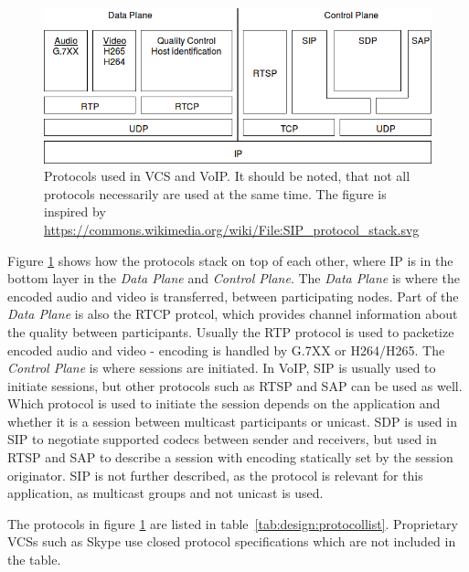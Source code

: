 \begin{figure}[H]
	\centering
	\includegraphics[width=\textwidth]{figures/protocol_stack}
	\caption{Protocols used in VCS and VoIP. It should be noted, that not all protocols necessarily are used at the same time. The figure is inspired by \url{https://commons.wikimedia.org/wiki/File:SIP_protocol_stack.svg}}
	\label{fig:design:protocolstack}
\end{figure} 

Figure \ref{fig:design:protocolstack} shows how the protocols stack on top of each other, where IP is in the bottom layer in the \textit{Data Plane} and \textit{Control Plane}. The  \textit{Data Plane} is where the encoded audio and video is transferred, between participating nodes. Part of the \textit{Data Plane} is also the RTCP protcol, which provides channel information about the quality between participants. Usually the RTP protocol is used to packetize encoded audio and video - encoding is handled by G.7XX or H264/H265. The \textit{Control Plane} is where sessions are initiated. In VoIP, \ac{SIP} is usually used to initiate sessions, but other protocols such as RTSP and SAP can be used as well. Which protocol is used to initiate the session depends on the application and whether it is a session between multicast participants or unicast. SDP is used in \ac{SIP} to negotiate supported codecs between sender and receivers, but used in RTSP and SAP to describe a session with encoding statically set by the session originator\citep{voip_fundamentals}.  \ac{SIP} is not further described, as the protocol is relevant for this application, as multicast groups and not unicast is used. 

The protocols in figure \ref{fig:design:protocolstack} are listed in table~\ref{tab:design:protocollist}. Proprietary VCSs such as Skype use closed protocol specifications which are not included in the table.


